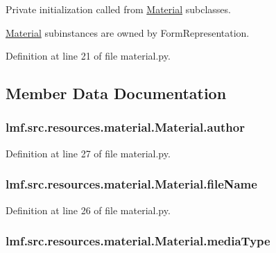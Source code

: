 Private initialization called from \hyperlink{classlmf_1_1src_1_1resources_1_1material_1_1_material}{Material} subclasses. 

\hyperlink{classlmf_1_1src_1_1resources_1_1material_1_1_material}{Material} subinstances are owned by Form\+Representation. 

Definition at line 21 of file material.\+py.



\subsection{Member Data Documentation}
\hypertarget{classlmf_1_1src_1_1resources_1_1material_1_1_material_aef7b8711bf9663d23434fab0332d0824}{
\subsubsection[{author}]{\setlength{\rightskip}{0pt plus 5cm}lmf.\+src.\+resources.\+material.\+Material.\+author}}\label{classlmf_1_1src_1_1resources_1_1material_1_1_material_aef7b8711bf9663d23434fab0332d0824}


Definition at line 27 of file material.\+py.

\hypertarget{classlmf_1_1src_1_1resources_1_1material_1_1_material_a51df3bf6cd710ff574713abde19b8752}{
\subsubsection[{file\+Name}]{\setlength{\rightskip}{0pt plus 5cm}lmf.\+src.\+resources.\+material.\+Material.\+file\+Name}}\label{classlmf_1_1src_1_1resources_1_1material_1_1_material_a51df3bf6cd710ff574713abde19b8752}


Definition at line 26 of file material.\+py.

\hypertarget{classlmf_1_1src_1_1resources_1_1material_1_1_material_ab41c0ac48aa33b79087a6fa568836a4a}{
\subsubsection[{media\+Type}]{\setlength{\rightskip}{0pt plus 5cm}lmf.\+src.\+resources.\+material.\+Material.\+media\+Type}}\label{classlmf_1_1src_1_1resources_1_1material_1_1_material_ab41c0ac48aa33b79087a6fa568836a4a}



